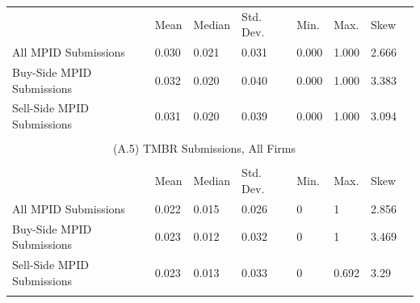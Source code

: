 \documentclass{article}
\begin{document}
\begin{table}[htp!]
\begin{center}
{\begin{tabular}{lp{1.5cm}p{1.5cm}p{1.5cm}p{1.5cm}p{1.5cm}p{1.5cm}p{1.5cm}}
                                                      & Mean  & Median & Std. Dev. & Min.  & Max.  & Skew  \\
All MPID Submissions                                  & 0.030 & 0.021  & 0.031     & 0.000 & 1.000 & 2.666 \\
Buy-Side MPID Submissions                             & 0.032 & 0.020  & 0.040     & 0.000 & 1.000 & 3.383 \\
Sell-Side MPID Submissions                            & 0.031 & 0.020  & 0.039     & 0.000 & 1.000 & 3.094 \\ \\
\multicolumn{7}{c}{(A.5) TMBR Submissions, All Firms}                   \\  \\
                                                      & Mean  & Median & Std. Dev. & Min.  & Max.  & Skew     \\
All MPID Submissions       & 0.022  & 0.015     & 0.026 & 0    & 1     & 2.856 \\
Buy-Side MPID Submissions  & 0.023  & 0.012     & 0.032 & 0    & 1     & 3.469  \\
Sell-Side MPID Submissions & 0.023  & 0.013     & 0.033 & 0    & 0.692 & 3.29  \\
\\
\hline \hline
\end{tabular}}
\begin{minipage}{0.75\textwidth}
\footnotesize
\end{minipage}
\end{center}
\end{table}
\end{document}
